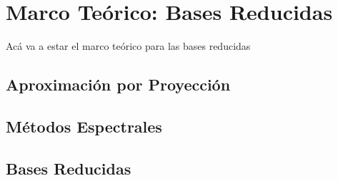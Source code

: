 \chapter{Marco Teórico: Bases Reducidas}
Acá va a estar el marco teórico para las bases reducidas

\section{Aproximación por Proyección}
\section{Métodos Espectrales}
\section{Bases Reducidas}
